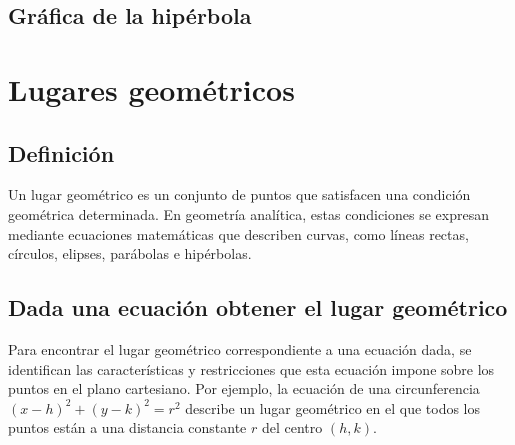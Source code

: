 \subsection{Gráfica de la hipérbola}
\begin{center}
\end{center}


\section{Lugares geométricos} %

\subsection{Definición}
Un lugar geométrico es un conjunto de puntos que satisfacen una condición geométrica determinada. En geometría analítica, estas condiciones se expresan mediante ecuaciones matemáticas que describen curvas, como líneas rectas, círculos, elipses, parábolas e hipérbolas.

\subsection{Dada una ecuación obtener el lugar geométrico}
Para encontrar el lugar geométrico correspondiente a una ecuación dada, se identifican las características y restricciones que esta ecuación impone sobre los puntos en el plano cartesiano. Por ejemplo, la ecuación de una circunferencia $(x - h)^2 + (y - k)^2 = r^2$ describe un lugar geométrico en el que todos los puntos están a una distancia constante $r$ del centro $(h, k)$.

